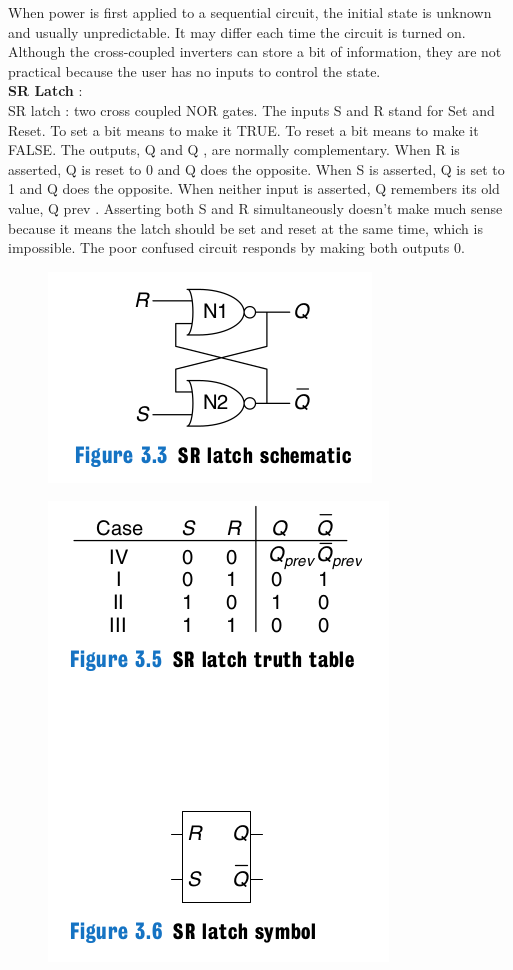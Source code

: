 \documentclass{article}[12pt]
\begin{document}
When power is first applied to a sequential circuit, the initial state is
unknown and usually unpredictable. It may differ each time the circuit is
turned on. Although the cross-coupled inverters can store a bit of information,
they are not practical because the user has no inputs to control the state. \\ 
\textbf{SR Latch} : \\ 
SR latch : two cross coupled NOR gates. The
inputs S and R stand for Set and Reset. To set a bit means to make it
TRUE. To reset a bit means to make it FALSE. The outputs, Q and Q ,
are normally complementary. When R is asserted, Q is reset to 0 and Q
does the opposite. When S is asserted, Q is set to 1 and Q does the
opposite. When neither input is asserted, Q remembers its old value,
Q prev . Asserting both S and R simultaneously doesn't make much sense
because it means the latch should be set and reset at the same time,
which is impossible. The poor confused circuit responds by making both
outputs 0.
\begin{figure}[htbp]
\centerline{\includegraphics[scale = 0.3]{../Images/sr.png}}
\end{figure}

\begin{figure}[htbp]
\centerline{\includegraphics[scale = 0.3]{../Images/sr2.png}}
\end{figure}
\end{document}
